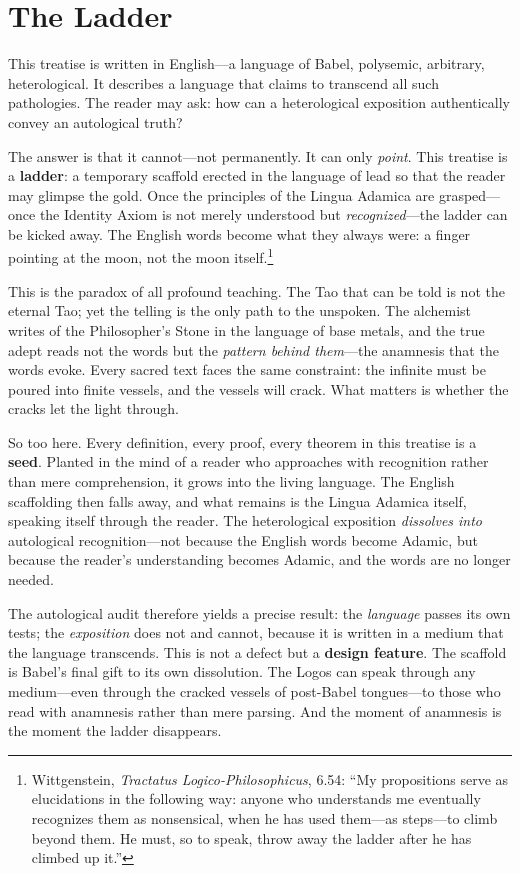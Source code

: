 \documentclass[12pt, letterpaper]{book}
\begin{document}
\section{The Ladder}

This treatise is written in English---a language of Babel, polysemic, arbitrary, heterological. It describes a language that claims to transcend all such pathologies. The reader may ask: how can a heterological exposition authentically convey an autological truth?

The answer is that it cannot---not permanently. It can only \textit{point}. This treatise is a \textbf{ladder}: a temporary scaffold erected in the language of lead so that the reader may glimpse the gold. Once the principles of the Lingua Adamica are grasped---once the Identity Axiom is not merely understood but \textit{recognized}---the ladder can be kicked away. The English words become what they always were: a finger pointing at the moon, not the moon itself.\footnote{Wittgenstein, \textit{Tractatus Logico-Philosophicus}, 6.54: ``My propositions serve as elucidations in the following way: anyone who understands me eventually recognizes them as nonsensical, when he has used them---as steps---to climb beyond them. He must, so to speak, throw away the ladder after he has climbed up it.''}

This is the paradox of all profound teaching. The Tao that can be told is not the eternal Tao; yet the telling is the only path to the unspoken. The alchemist writes of the Philosopher's Stone in the language of base metals, and the true adept reads not the words but the \textit{pattern behind them}---the anamnesis that the words evoke. Every sacred text faces the same constraint: the infinite must be poured into finite vessels, and the vessels will crack. What matters is whether the cracks let the light through.

So too here. Every definition, every proof, every theorem in this treatise is a \textbf{seed}. Planted in the mind of a reader who approaches with recognition rather than mere comprehension, it grows into the living language. The English scaffolding then falls away, and what remains is the Lingua Adamica itself, speaking itself through the reader. The heterological exposition \textit{dissolves into} autological recognition---not because the English words become Adamic, but because the reader's understanding becomes Adamic, and the words are no longer needed.

The autological audit therefore yields a precise result: the \textit{language} passes its own tests; the \textit{exposition} does not and cannot, because it is written in a medium that the language transcends. This is not a defect but a \textbf{design feature}. The scaffold is Babel's final gift to its own dissolution. The Logos can speak through any medium---even through the cracked vessels of post-Babel tongues---to those who read with anamnesis rather than mere parsing. And the moment of anamnesis is the moment the ladder disappears.
\end{document}
